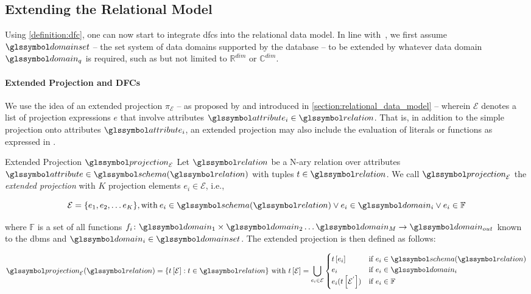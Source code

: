 \subsection{Extending the Relational Model}

Using \cref{definition:dfc}, one can now start to integrate \acrshort{dfc}s into the relational data model. In line with~\cite{Giangreco:2018thesis}, we first assume $\domainset$ -- the set system of data domains supported by the database -- to be extended by whatever data domain $\domain_q$ is required, such as but not limited to $\mathbb{R}^{dim}$ or $\mathbb{C}^{dim}$. 

\paragraph{Extended Projection and DFCs}

We use the idea of an extended projection $\pi_{\mathcal{E}}$ -- as proposed by \cite{Gupta:1995Generalized,Garcia:2009Database} and introduced in \cref{section:relational_data_model} -- wherein $\mathcal{E}$ denotes a list of projection expressions $e$ that involve attributes $\attribute_i \in \relation$. That is, in addition to the simple projection onto attributes $\attribute_i$, an extended projection may also include the evaluation of literals or functions as expressed in . 

\begin{definition}[label=definition:extended_projection]{Extended Projection $\projection_\mathcal{E}$}{}
Let $\relation$ be a N-ary relation over attributes $\attribute \in \schema (\relation)$ with tuples $t \in \relation$. We call $\projection_\mathcal{E}$ the \emph{extended projection} with $K$ projection elements $e_i \in \mathcal{E}$, i.e.,

\begin{equation*}
    \mathcal{E} = \{ e_1, e_2, \ldots e_K \}, \textrm{with} \: e_i \in \schema(\relation) \vee e_i \in \domain_i \vee e_i \in \mathbb{F}
\end{equation*}

where $\mathbb{F}$ is a set of all functions $f_i \colon \domain_{1} \times \domain_{2} \ldots \domain_{M} \rightarrow \domain_{out}$ known to the \acrshort{dbms} and $\domain_i \in \domainset$. The extended projection is then defined as follows:

\begin{equation*}
    \projection_{\mathcal{E}}(\relation) =  \{ t\left[ \mathcal{E} \right] : t \in \relation \} \textrm{ with } t\left[ \mathcal{E} \right] = \bigcup_{e_i \in \mathcal{E}}
    \begin{cases} 
        t \left[ e_i \right] & \text{if } e_i \in \schema(\relation) \\
        e_i  & \text{if } e_i \in \domain_i \\
        e_i(t \left[ \mathcal{E}^{'} \right]) & \text{if } e_i \in \mathbb{F} \\
    \end{cases}
\end{equation*}
\end{definition}

